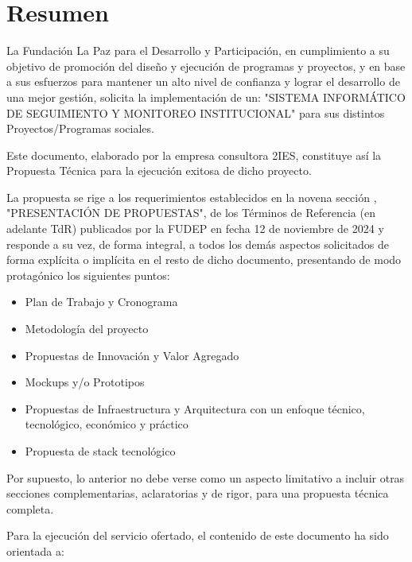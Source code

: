 \section{Resumen}

La Fundación La Paz para el Desarrollo y Participación, en cumplimiento a su objetivo de promoción del diseño y ejecución de programas y proyectos, y en base a sus esfuerzos para mantener un alto nivel de confianza y lograr el desarrollo de una mejor gestión,
solicita la implementación de un:
"SISTEMA INFORMÁTICO DE SEGUIMIENTO Y MONITOREO INSTITUCIONAL"
para sus distintos Proyectos/Programas sociales.

Este documento, elaborado por la empresa consultora 2IES, constituye así la Propuesta Técnica para la ejecución exitosa de dicho proyecto.

La propuesta se rige a los requerimientos establecidos en la novena sección , "PRESENTACIÓN DE PROPUESTAS", de los Términos de Referencia (en adelante TdR) publicados por la FUDEP en fecha 12 de noviembre de 2024 
y responde a su vez, de forma integral, a todos los demás aspectos solicitados de forma explícita o implícita en el resto de dicho documento,
presentando de modo protagónico los siguientes puntos:

\begin{itemize}
    \item Plan de Trabajo y Cronograma
    \item Metodología del proyecto
    \item Propuestas de Innovación y Valor Agregado
    \item Mockups y/o Prototipos
    \item Propuestas de Infraestructura y Arquitectura con un enfoque técnico, tecnológico, económico y práctico
    \item Propuesta de stack tecnológico
\end{itemize}

Por supuesto, lo anterior no debe verse como un aspecto limitativo a incluir otras secciones complementarias, aclaratorias y de rigor, para una propuesta técnica completa.

Para la ejecución del servicio ofertado, el contenido de este documento ha sido orientada a:

